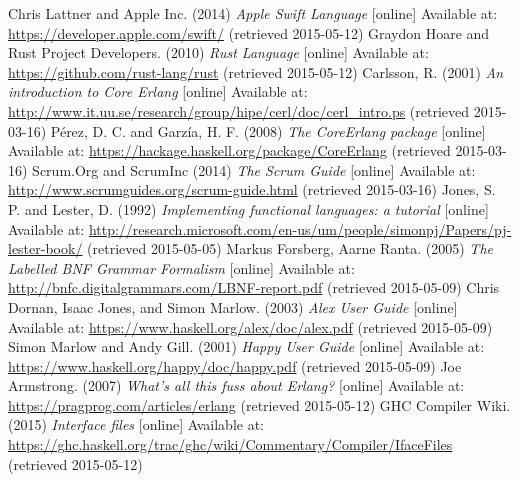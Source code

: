 \begin{thebibliography}{69}
 Chris Lattner and Apple Inc. (2014) \textit{Apple Swift Language} [online] Available at: \url{https://developer.apple.com/swift/} (retrieved 2015-05-12)
 Graydon Hoare and Rust Project Developers. (2010) \textit{Rust Language} [online] Available at: \url{https://github.com/rust-lang/rust} (retrieved 2015-05-12)
 Carlsson, R. (2001) \textit{An introduction to Core Erlang} [online] Available at: \url{http://www.it.uu.se/research/group/hipe/cerl/doc/cerl_intro.ps} (retrieved 2015-03-16)
 Pérez, D. C. and Garzía, H. F. (2008) \textit{The CoreErlang package} [online] Available at: \url{https://hackage.haskell.org/package/CoreErlang} (retrieved 2015-03-16)
 Scrum.Org and ScrumInc (2014) \textit{The Scrum Guide} [online] Available at: \url{http://www.scrumguides.org/scrum-guide.html} (retrieved 2015-03-16)
 Jones, S. P. and Lester, D. (1992) \textit{Implementing functional languages: a tutorial} [online] Available at: \url{http://research.microsoft.com/en-us/um/people/simonpj/Papers/pj-lester-book/} (retrieved 2015-05-05)
 Markus Forsberg, Aarne Ranta. (2005) \textit{The Labelled BNF Grammar Formalism} [online] Available at: \url{http://bnfc.digitalgrammars.com/LBNF-report.pdf} (retrieved 2015-05-09)
 Chris Dornan, Isaac Jones, and Simon Marlow. (2003) \textit{Alex User Guide} [online] Available at: \url{https://www.haskell.org/alex/doc/alex.pdf} (retrieved 2015-05-09)
 Simon Marlow and Andy Gill. (2001) \textit{Happy User Guide} [online] Available at: \url{https://www.haskell.org/happy/doc/happy.pdf} (retrieved 2015-05-09)
 Joe Armstrong. (2007) \textit{What's all this fuss about Erlang?} [online] Available at: \url{https://pragprog.com/articles/erlang} (retrieved 2015-05-12)
  GHC Compiler Wiki. (2015) \textit{Interface files} [online] Available at: \url{https://ghc.haskell.org/trac/ghc/wiki/Commentary/Compiler/IfaceFiles} (retrieved 2015-05-12)


\end{thebibliography}
